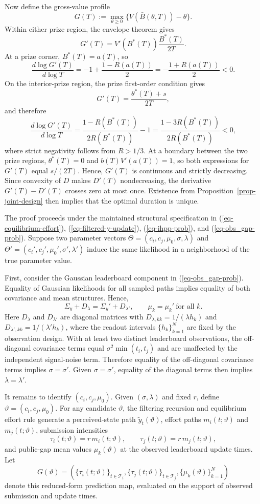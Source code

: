 \documentclass[mnsc]{informs3}
\begin{document}
\begin{APPENDICES}
Now define the gross-value profile
\[
G(T):=\max_{\theta\geq0}
\{V(\bar B(\theta,T))-\theta\}.
\]
Within either prize region, the envelope theorem gives
\[
G'(T)=V'(B^*(T))\frac{B^*(T)}{2T}.
\]
At a prize corner, $B^*(T)=a(T)$, so
\[
\frac{d\log G'(T)}{d\log T}
=-1+\frac{1-R(a(T))}{2}
=-\frac{1+R(a(T))}{2}<0.
\]
On the interior-prize region, the prize first-order condition gives
\[
G'(T)=\frac{\theta^*(T)+s}{2T},
\]
and therefore
\[
\frac{d\log G'(T)}{d\log T}
=\frac{1-R(B^*(T))}{2R(B^*(T))}-1
=\frac{1-3R(B^*(T))}{2R(B^*(T))}<0,
\]
where strict negativity follows from $R>1/3$. At a boundary between the two prize regions, $\theta^*(T)=0$ and $b(T)V'(a(T))=1$, so both expressions for $G'(T)$ equal $s/(2T)$. Hence, $G'(T)$ is continuous and strictly decreasing. Since convexity of $D$ makes $D'(T)$ nondecreasing, the derivative $G'(T)-D'(T)$ crosses zero at most once. Existence from Proposition~\ref{prop-joint-design} then implies that the optimal duration is unique.
\Halmos
\endproof

The proof proceeds under the maintained structural specification in
(\ref{eq-equilibrium-effort}), (\ref{eq-filtered-y-update}),
(\ref{eq-ihpp-prob}), and (\ref{eq-obs_gap-prob}).
Suppose two parameter vectors $\Theta=(c_i,c_j,\mu_0,\sigma,\lambda)$ and
$\Theta'=(c_i',c_j',\mu_0',\sigma',\lambda')$ induce the same likelihood in a
neighborhood of the true parameter value.

First, consider the Gaussian leaderboard component in (\ref{eq-obs_gap-prob}). 
Equality of Gaussian likelihoods for all sampled paths implies equality of both covariance and mean structures. 
Hence,
\begin{equation*}
\Sigma_y + D_\lambda
=
\Sigma_y' + D_{\lambda'},
\qquad
\mu_k=\mu_k'\ \text{for all } k.
\end{equation*}
Here $D_\lambda$ and $D_{\lambda'}$ are diagonal matrices with $D_{\lambda,kk}=1/(\lambda h_k)$ and $D_{\lambda',kk}=1/(\lambda' h_k)$, where the readout intervals $\{h_k\}_{k=1}^N$ are fixed by the observation design.
With at least two distinct leaderboard observations, the off-diagonal covariance terms equal $\sigma^2\min(t_i,t_j)$ and are unaffected by the independent signal-noise term. 
Therefore equality of the off-diagonal covariance terms implies $\sigma=\sigma'$. Given $\sigma=\sigma'$, equality of the diagonal terms then implies $\lambda=\lambda'$.

It remains to identify $(c_i,c_j,\mu_0)$.
Given $(\sigma,\lambda)$ and fixed $r$, define $\vartheta=(c_i,c_j,\mu_0)$.
For any candidate $\vartheta$, the filtering recursion and equilibrium effort rule generate a perceived-state path $\tilde y_t(\vartheta)$, effort paths $m_i(t;\vartheta)$ and $m_j(t;\vartheta)$, submission intensities
\[
\tau_i(t;\vartheta)=r\,m_i(t;\vartheta),
\qquad
\tau_j(t;\vartheta)=r\,m_j(t;\vartheta),
\]
and public-gap mean values $\mu_k(\vartheta)$ at the observed leaderboard update times.
Let
\[
G(\vartheta)
=
\left(
\{\tau_i(t;\vartheta)\}_{t\in\mathcal T_i},
\{\tau_j(t;\vartheta)\}_{t\in\mathcal T_j},
\{\mu_k(\vartheta)\}_{k=1}^N
\right)
\]
denote this reduced-form prediction map, evaluated on the support of observed submission and update times.


\end{APPENDICES}
\end{document}

